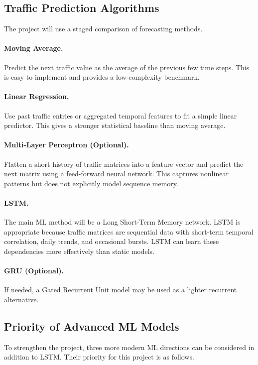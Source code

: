 \documentclass[11pt]{article}
\begin{document}
\subsection{Traffic Prediction Algorithms}
The project will use a staged comparison of forecasting methods.

\paragraph{Moving Average.}
Predict the next traffic value as the average of the previous few time steps. This is easy to implement and provides a low-complexity benchmark.

\paragraph{Linear Regression.}
Use past traffic entries or aggregated temporal features to fit a simple linear predictor. This gives a stronger statistical baseline than moving average.

\paragraph{Multi-Layer Perceptron (Optional).}
Flatten a short history of traffic matrices into a feature vector and predict the next matrix using a feed-forward neural network. This captures nonlinear patterns but does not explicitly model sequence memory.

\paragraph{LSTM.}
The main ML method will be a Long Short-Term Memory network. LSTM is appropriate because traffic matrices are sequential data with short-term temporal correlation, daily trends, and occasional bursts. LSTM can learn these dependencies more effectively than static models.

\paragraph{GRU (Optional).}
If needed, a Gated Recurrent Unit model may be used as a lighter recurrent alternative.

\subsection{Priority of Advanced ML Models}
To strengthen the project, three more modern ML directions can be considered in addition to LSTM. Their priority for this project is as follows.
\end{document}
